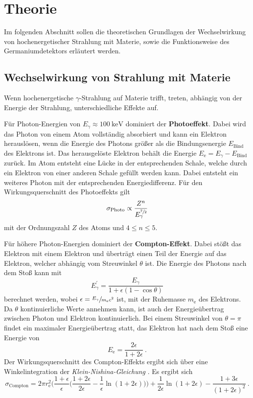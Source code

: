 \section{Theorie}
\label{sec:theorie}

Im folgenden Abschnitt sollen die theoretischen Grundlagen der Wechselwirkung von hochenergetischer Strahlung mit Materie,
sowie die Funktionsweise des Germaniumdetektors erläutert werden.

\subsection{Wechselwirkung von Strahlung mit Materie}

Wenn hochenergetische $\gamma$-Strahlung auf Materie trifft,
treten,
abhängig von der Energie der Strahlung,
unterschiedliche Effekte auf.

Für Photon-Energien von $E_{\gamma} \approx \SI{100}{\kilo\eV}$ dominiert der \textbf{Photoeffekt}.
Dabei wird das Photon von einem Atom vollständig absorbiert und kann ein Elektron herauslösen,
wenn die Energie des Photons größer als die Bindungsenergie $E_\text{Bind}$ des Elektrons ist.
Das herausgelöste Elektron behält die Energie $E_\text{e} = E_{\gamma} - E_\text{Bind}$ zurück.
Im Atom entsteht eine Lücke in der entsprechenden Schale,
welche durch ein Elektron von einer anderen Schale gefüllt werden kann.
Dabei entsteht ein weiteres Photon mit der entsprechenden Energiedifferenz.
Für den Wirkungsquerschnitt des Photoeffekts gilt
\begin{equation*}
    \sigma_\text{Photo} \propto \frac{Z^n}{E^{\sfrac{7}{2}}_{\gamma}}
\end{equation*}
mit der Ordnungszahl $Z$ des Atoms und $4 \leq n \leq \num{5}$.

Für höhere Photon-Energien dominiert der \textbf{Compton-Effekt}.
Dabei stößt das Elektron mit einem Elektron und überträgt einen Teil der Energie auf das Elektron,
welcher abhängig vom Streuwinkel $\theta$ ist.
Die Energie des Photons nach dem Stoß kann mit
\begin{equation*}
    E^{'}_{\gamma} = \frac{E_{\gamma}}{1 + \epsilon(1 - \cos{\theta})}
\end{equation*}
berechnet werden,
wobei $\epsilon = \sfrac{E_{\gamma}}{m_\text{e} c^2}$ ist,
mit der Ruhemasse $m_\text{e}$ des Elektrons.
Da $\theta$ kontinuierliche Werte annehmen kann,
ist auch der Energieübertrag zwischen Photon und Elektron kontinuierlich.
Bei einem Streuwinkel von $\theta = \pi$ findet ein maximaler Energieübertrag statt,
das Elektron hat nach dem Stoß eine Energie von
\begin{equation*}
    E_\text{e} = \frac{2 \epsilon}{1 + 2 \epsilon} \ .
\end{equation*}
Der Wirkungsquerschnitt des Compton-Effekts ergibt sich über eine Winkelintegration der \emph{Klein-Nishina-Gleichung} \cite{TODO}.
Es ergibt sich
\begin{equation}
    \sigma_\text{Compton} =
    2 \pi r^2_\text{e} \biggl(\frac{1+\epsilon}{\epsilon} \biggl(\frac{1+2\epsilon}{2\epsilon} - \frac{1}{\epsilon}\ln(1+2\epsilon)\biggr)\biggr)
    + \frac{1}{2\epsilon} \ln(1+2\epsilon) - \frac{1+3\epsilon}{(1+2\epsilon)^2} \ .
\end{equation}